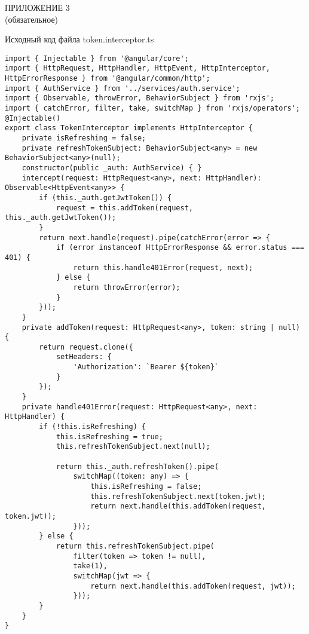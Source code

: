 \label{на-приложение-3}
\begin{center}
    ПРИЛОЖЕНИЕ 3\\
    (обязательное)


    Исходный код файла token.interceptor.ts
\end{center}

\begin{lstlisting}
import { Injectable } from '@angular/core';
import { HttpRequest, HttpHandler, HttpEvent, HttpInterceptor, HttpErrorResponse } from '@angular/common/http';
import { AuthService } from '../services/auth.service';
import { Observable, throwError, BehaviorSubject } from 'rxjs';
import { catchError, filter, take, switchMap } from 'rxjs/operators';
@Injectable()
export class TokenInterceptor implements HttpInterceptor {
    private isRefreshing = false;
    private refreshTokenSubject: BehaviorSubject<any> = new BehaviorSubject<any>(null);
    constructor(public _auth: AuthService) { }
    intercept(request: HttpRequest<any>, next: HttpHandler): Observable<HttpEvent<any>> {
        if (this._auth.getJwtToken()) {
            request = this.addToken(request, this._auth.getJwtToken());
        }
        return next.handle(request).pipe(catchError(error => {
            if (error instanceof HttpErrorResponse && error.status === 401) {
                return this.handle401Error(request, next);
            } else {
                return throwError(error);
            }
        }));
    }
    private addToken(request: HttpRequest<any>, token: string | null) {
        return request.clone({
            setHeaders: {
                'Authorization': `Bearer ${token}`
            }
        });
    }
    private handle401Error(request: HttpRequest<any>, next: HttpHandler) {
        if (!this.isRefreshing) {
            this.isRefreshing = true;
            this.refreshTokenSubject.next(null);

            return this._auth.refreshToken().pipe(
                switchMap((token: any) => {
                    this.isRefreshing = false;
                    this.refreshTokenSubject.next(token.jwt);
                    return next.handle(this.addToken(request, token.jwt));
                }));
        } else {
            return this.refreshTokenSubject.pipe(
                filter(token => token != null),
                take(1),
                switchMap(jwt => {
                    return next.handle(this.addToken(request, jwt));
                }));
        }
    }
}
\end{lstlisting}
\clearpage

